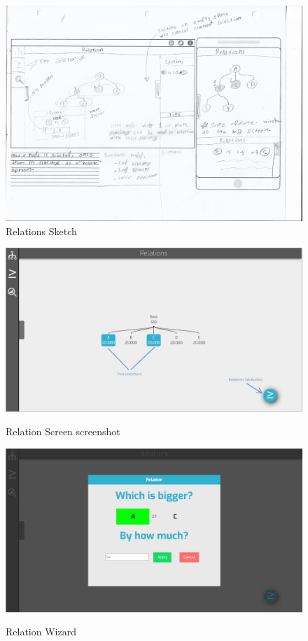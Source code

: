 \documentclass[11pt]{article} %
\begin{document}
\begin{figure}
   	\centering
    	\caption{Relations Sketch}
 	\includegraphics[width=0.75\linewidth, angle=90]{realtionScreenSketch}
    
    \label{sketch:realtionScreenSketch}
\end{figure}

\begin{figure}
  \caption{Relation Screen screenshot}
  \centering
  \includegraphics[width=\textwidth]{relationScreenshot}
  \label{screenshot:relation screen}
\end{figure}

\begin{figure}
  \caption{Relation Wizard}
  \centering
  \includegraphics[width=\textwidth]{relationWizard}
  \label{screenshot:relation wizard}
\end{figure}
\end{document}

